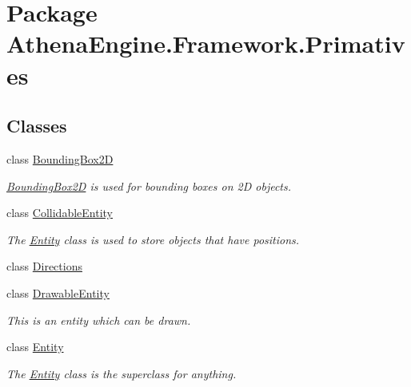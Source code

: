 \hypertarget{namespace_athena_engine_1_1_framework_1_1_primatives}{\section{Package Athena\-Engine.\-Framework.\-Primatives}
\label{namespace_athena_engine_1_1_framework_1_1_primatives}
}
\subsection*{Classes}
\begin{DoxyCompactItemize}
\item 
class \hyperlink{class_athena_engine_1_1_framework_1_1_primatives_1_1_bounding_box2_d}{Bounding\-Box2\-D}
\begin{DoxyCompactList}\small\item\em \hyperlink{class_athena_engine_1_1_framework_1_1_primatives_1_1_bounding_box2_d}{Bounding\-Box2\-D} is used for bounding boxes on 2\-D objects. \end{DoxyCompactList}\item 
class \hyperlink{class_athena_engine_1_1_framework_1_1_primatives_1_1_collidable_entity}{Collidable\-Entity}
\begin{DoxyCompactList}\small\item\em The \hyperlink{class_athena_engine_1_1_framework_1_1_primatives_1_1_entity}{Entity} class is used to store objects that have positions. \end{DoxyCompactList}\item 
class \hyperlink{class_athena_engine_1_1_framework_1_1_primatives_1_1_directions}{Directions}
\item 
class \hyperlink{class_athena_engine_1_1_framework_1_1_primatives_1_1_drawable_entity}{Drawable\-Entity}
\begin{DoxyCompactList}\small\item\em This is an entity which can be drawn. \end{DoxyCompactList}\item 
class \hyperlink{class_athena_engine_1_1_framework_1_1_primatives_1_1_entity}{Entity}
\begin{DoxyCompactList}\small\item\em The \hyperlink{class_athena_engine_1_1_framework_1_1_primatives_1_1_entity}{Entity} class is the superclass for anything. \end{DoxyCompactList}\end{DoxyCompactItemize}
